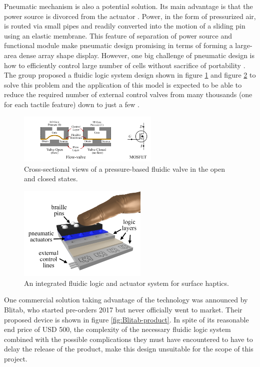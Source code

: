 Pneumatic mechanism is also a potential solution.
Its main advantage is that the power source is divorced from the actuator \cite{russomanno_design_2015}.
Power, in the form of pressurized air, is routed via small pipes and readily converted into the motion of a sliding pin using an elastic membrane.
This feature of separation of power source and functional module make pneumatic design promising in terms of forming a large-area dense array shape display.
However, one big challenge of pneumatic design is how to efficiently control large number of cells without sacrifice of portability \cite{russomanno_model-based_2017}.
The group proposed a fluidic logic system design shown in figure \ref{fig:pneumatic-schema} and figure \ref{fig:Integrated fluidic logic system} to solve this problem and the application of this model is expected to be able to reduce the required number of external control valves from many thousands (one for each tactile feature) down to just a few \cite{russomanno_design_2015}.

\begin{figure}[ht]\centering
    \includegraphics[width=0.6\textwidth]{figures/pneumatic-schema.png}
\caption{Cross-sectional views of a pressure-based fluidic valve in the open and closed states.}
\label{fig:pneumatic-schema}
\end{figure}
\begin{figure}[ht]\centering
    \includegraphics[height=4.5cm]{figures/fluidic logic system.png}
\caption{An integrated fluidic logic and actuator system for surface haptics.}
\label{fig:Integrated fluidic logic system}
\end{figure}

One commercial solution taking advantage of the technology was announced by Blitab, who started pre-orders 2017 but never officially went to market. Their proposed device is shown in figure \ref{fig:Blitab-product}.
In spite of its reasonable end price of USD 500, the complexity of the necessary fluidic logic system combined with the possible complications they must have encountered to have to delay the release of the product, make this design unsuitable for the scope of this project.

